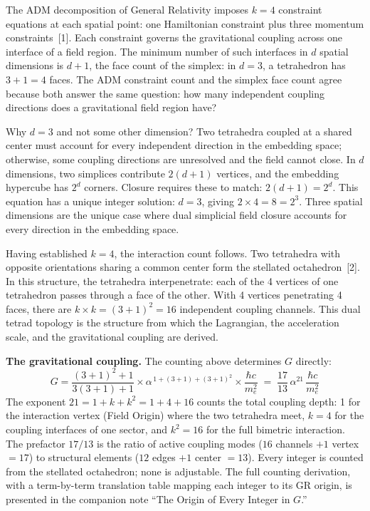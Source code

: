 \documentclass[11pt]{article}
\begin{document}
The ADM decomposition of General Relativity imposes $k = 4$ constraint equations at each spatial point: one Hamiltonian constraint plus three momentum constraints~[1].
Each constraint governs the gravitational coupling across one interface of a field region.
The minimum number of such interfaces in $d$ spatial dimensions is $d + 1$, the face count of the simplex: in $d = 3$, a tetrahedron has $3 + 1 = 4$ faces.
The ADM constraint count and the simplex face count agree because both answer the same question: how many independent coupling directions does a gravitational field region have?

Why $d = 3$ and not some other dimension?
Two tetrahedra coupled at a shared center must account for every independent direction in the embedding space; otherwise, some coupling directions are unresolved and the field cannot close.
In $d$ dimensions, two simplices contribute $2(d+1)$ vertices, and the embedding hypercube has $2^d$ corners.
Closure requires these to match: $2(d+1) = 2^d$.
This equation has a unique integer solution: $d = 3$, giving $2 \times 4 = 8 = 2^3$.
Three spatial dimensions are the unique case where dual simplicial field closure accounts for every direction in the embedding space.

Having established $k = 4$, the interaction count follows.
Two tetrahedra with opposite orientations sharing a common center form the stellated octahedron~[2].
In this structure, the tetrahedra interpenetrate: each of the 4 vertices of one tetrahedron passes through a face of the other.
With 4 vertices penetrating 4 faces, there are $k \times k = (3{+}1)^2 = 16$ independent coupling channels.
This dual tetrad topology is the structure from which the Lagrangian, the acceleration scale, and the gravitational coupling are derived.

\textbf{The gravitational coupling.}\quad
The counting above determines $G$ directly:
\begin{equation}
G = \frac{(3+1)^2 + 1}{3(3+1) + 1} \times \alpha^{\,1 + (3+1) + (3+1)^2} \times \frac{\hbar c}{m_e^2} \;=\; \frac{17}{13}\,\alpha^{21}\,\frac{\hbar c}{m_e^2}
\label{eq:G}
\end{equation}
The exponent $21 = 1 + k + k^2 = 1 + 4 + 16$ counts the total coupling depth: 1 for the interaction vertex (Field Origin) where the two tetrahedra meet, $k = 4$ for the coupling interfaces of one sector, and $k^2 = 16$ for the full bimetric interaction.
The prefactor $17/13$ is the ratio of active coupling modes ($16$ channels $+ 1$ vertex $= 17$) to structural elements ($12$ edges $+ 1$ center $= 13$).
Every integer is counted from the stellated octahedron; none is adjustable.
The full counting derivation, with a term-by-term translation table mapping each integer to its GR origin, is presented in the companion note ``The Origin of Every Integer in $G$.''
\end{document}
